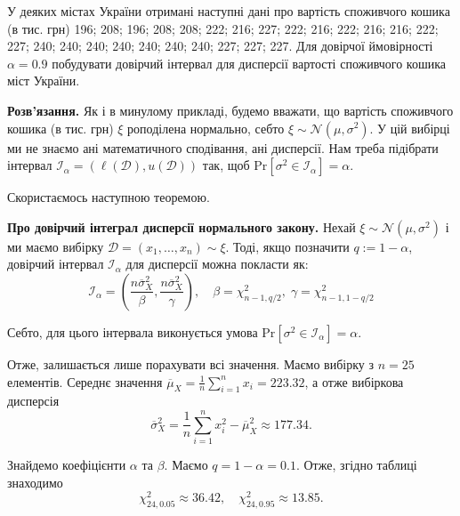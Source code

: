 \documentclass{../hw_template}
\begin{document}
\begin{problem}
    У деяких містах України отримані наступні дані про вартість споживчого
кошика (в тис. грн) 196; 208; 196; 208; 208; 222; 216; 227; 222; 216; 222; 216;
216; 222; 227; 240; 240; 240; 240; 240; 240; 240; 227; 227; 227. Для довірчої
ймовірності $\alpha=0.9$ побудувати довірчий інтервал для дисперсії вартості
споживчого кошика міст України.
\end{problem}

\textbf{Розв'язання.} Як і в минулому прикладі, будемо вважати, що вартість споживчого кошика (в тис. грн) $\xi$ роподілена нормально, себто $\xi \sim \mathcal{N}(\mu,\sigma^2)$. У цій вибірці ми не знаємо ані математичного сподівання, ані дисперсії. Нам треба підібрати інтервал $\mathcal{I}_{\alpha} = (\ell(\mathcal{D}), u(\mathcal{D}))$ так, щоб $\text{Pr}[\sigma^2 \in \mathcal{I}_{\alpha}] = \alpha$. 

Скористаємось наступною теоремою.

\begin{theorem}
    \textbf{Про довірчий інтеграл дисперсії нормального закону.} Нехай $\xi \sim \mathcal{N}(\mu,\sigma^2)$ і ми маємо вибірку $\mathcal{D} = (x_1,\dots,x_n) \sim \xi$. Тоді, якщо позначити $q := 1-\alpha$, довірчий інтервал $\mathcal{I}_{\alpha}$ для дисперсії можна покласти як:
    \begin{equation*}
        \mathcal{I}_{\alpha} = \left(\frac{n\overline{\sigma}_X^2}{\beta}, \frac{n\overline{\sigma}_X^2}{\gamma}\right), \quad \beta = \chi^2_{n-1,q/2}, \; \gamma = \chi^2_{n-1,1-q/2}
    \end{equation*}

    Себто, для цього інтервала виконується умова $\text{Pr}[\sigma^2 \in \mathcal{I}_{\alpha}] = \alpha$.
\end{theorem}

Отже, залишається лише порахувати всі значення. Маємо вибірку з $n = 25$ елементів. Середнє значення $\overline{\mu}_X = \frac{1}{n}\sum_{i=1}^n x_i = 223.32$, а отже вибіркова дисперсія
\begin{equation*}
    \overline{\sigma}_X^2 = \frac{1}{n}\sum_{i=1}^n x_i^2 - \overline{\mu}_X^2 \approx 177.34.
\end{equation*}

Знайдемо коефіцієнти $\alpha$ та $\beta$. Маємо $q=1-\alpha=0.1$. Отже, згідно таблиці знаходимо
\begin{equation*}
    \chi_{24,0.05}^2 \approx 36.42, \quad \chi_{24,0.95}^2 \approx 13.85.
\end{equation*}
\end{document}

